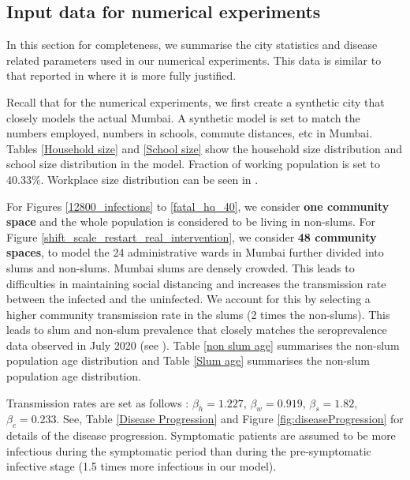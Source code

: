 \documentclass{article}
\theoremstyle{definition}
\begin{document}
\subsection{Input data for numerical experiments} \label{Numerical Parameters Section}
In this section for completeness, we summarise the city statistics and disease related parameters used in our numerical experiments. 
This data is similar to that reported in \cite{City_Simulator_IISc_TIFR_2020} where it is more fully justified.

Recall that for the numerical experiments, we first create a synthetic city that closely models the actual Mumbai. A synthetic model is set to match the numbers employed, numbers in schools, commute distances, etc in Mumbai.  
Tables \ref{Household size} and \ref{School size} show the household size distribution and school size distribution in the model.  Fraction of working population is set to 40.33\%. Workplace size distribution can be seen in \cite{City_Simulator_IISc_TIFR_2020}. 

For Figures \ref{12800_infections} to \ref{fatal_hq_40}, we consider \textbf{one community space} and the whole population is considered to be living in non-slums.  For Figure \ref{shift_scale_restart_real_intervention},
we consider \textbf{48 community spaces}, to model the 24 administrative wards in Mumbai further divided into slums and non-slums.
Mumbai slums are densely crowded. This  leads to difficulties in maintaining social distancing  and increases the transmission rate between the infected and the uninfected. We account for this by selecting a higher community transmission rate in the slums (2 times the non-slums). 
This leads to slum and non-slum prevalence that closely matches the seroprevalence data observed in July 2020 (see \cite{malani2020serosurvey}).
Table \ref{non slum age} summarises the non-slum population age distribution  and Table \ref{Slum age} summarises the non-slum population age distribution. 

 

 
 
 Transmission rates are set as follows : $\beta_h=1.227$, $\beta_w=0.919$, $\beta_s=1.82$, $\beta_c=0.233$. See, Table \ref{Disease Progression} and Figure \ref{fig:diseaseProgression} for details of the disease progression.  Symptomatic patients are assumed to be more infectious during the symptomatic period than during the pre-symptomatic infective stage (1.5 times more infectious in our model).
   
\end{document}

